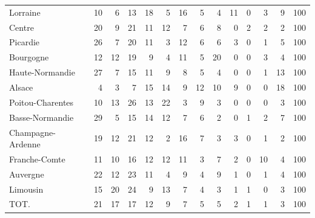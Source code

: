 \documentclass[11pt]{article}
\begin{document}
\begin{table}[H]
\begin{tabular}{lrrrrrrrrrrrrr}
Lorraine             &         10 &          6 &         13 &         18 &          5 &         16 &          5 &          4 &         11 &          0 &          3 &          9 &        100 \\
Centre               &         20 &          9 &         21 &         11 &         12 &          7 &          6 &          8 &          0 &          2 &          2 &          2 &        100 \\
Picardie             &         26 &          7 &         20 &         11 &          3 &         12 &          6 &          6 &          3 &          0 &          1 &          5 &        100 \\
Bourgogne            &         12 &         12 &         19 &          9 &          4 &         11 &          5 &         20 &          0 &          0 &          3 &          4 &        100 \\
Haute-Normandie      &         27 &          7 &         15 &         11 &          9 &          8 &          5 &          4 &          0 &          0 &          1 &         13 &        100 \\
Alsace               &          4 &          3 &          7 &         15 &         14 &          9 &         12 &         10 &          9 &          0 &          0 &         18 &        100 \\
Poitou-Charentes     &         10 &         13 &         26 &         13 &         22 &          3 &          9 &          3 &          0 &          0 &          0 &          3 &        100 \\
Basse-Normandie      &         29 &          5 &         15 &         14 &         12 &          7 &          6 &          2 &          0 &          1 &          2 &          7 &        100 \\
Champagne-Ardenne    &         19 &         12 &         21 &         12 &          2 &         16 &          7 &          3 &          3 &          0 &          1 &          2 &        100 \\
Franche-Comte        &         11 &         10 &         16 &         12 &         12 &         11 &          3 &          7 &          2 &          0 &         10 &          4 &        100 \\
Auvergne             &         22 &         12 &         23 &         11 &          4 &          9 &          4 &          9 &          1 &          0 &          1 &          4 &        100 \\
Limousin             &         15 &         20 &         24 &          9 &         13 &          7 &          4 &          3 &          1 &          1 &          0 &          3 &        100 \\
TOT.                 &         21 &         17 &         17 &         12 &          9 &          7 &          5 &          5 &          2 &          1 &          1 &          3 &        100 \\
\bottomrule
\end{tabular}

\end{table}
\end{document}
